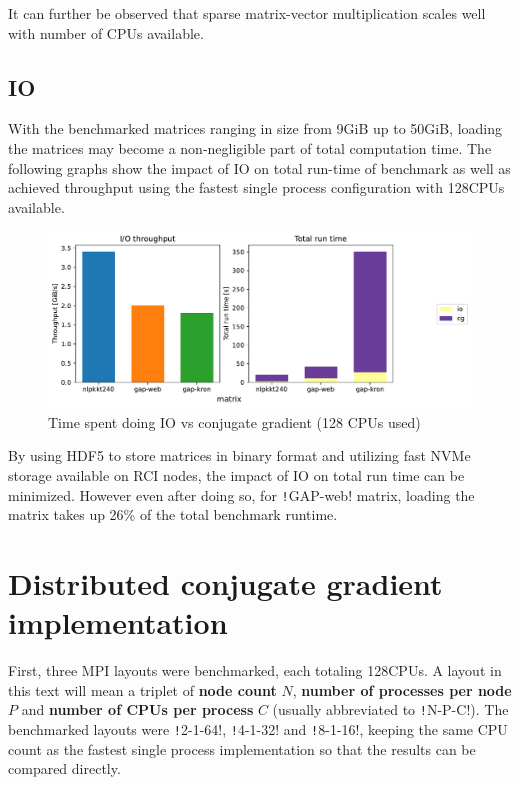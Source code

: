 \documentclass[thesis=M,english]{FITthesis}[2019/12/23]
\newcommand{\csre}[1]{\texttt!#1!}
\begin{document}
It can further be observed that sparse matrix-vector multiplication scales well with
number of CPUs available.

\subsection{IO}

With the benchmarked matrices ranging in size from 9GiB up to 50GiB, loading the matrices
may become a non-negligible part of total computation time. The following graphs show the impact of
IO on total run-time of benchmark as well as achieved throughput using the fastest single process
configuration with 128CPUs available.

\begin{figure}[htp]
    \centering
    \includegraphics[scale=0.6]{static/io_sp.pdf}
    \caption{Time spent doing IO vs conjugate gradient (128 CPUs used)}
\end{figure}

By using HDF5 to store matrices in binary format and utilizing fast NVMe storage available
on RCI nodes, the impact of IO on total run time can be minimized. However even after doing so,
for \csre{GAP-web} matrix, loading the matrix takes up 26\% of the total benchmark runtime.


\section{Distributed conjugate gradient implementation}

First, three MPI layouts were benchmarked, each totaling 128CPUs. A layout
in this text will mean a triplet of \textbf{node count} $N$,
\textbf{number of processes per node} $P$
and \textbf{number of CPUs per process} $C$ (usually abbreviated to \csre{N-P-C}).
The benchmarked layouts were \csre{2-1-64}, \csre{4-1-32} and \csre{8-1-16}, keeping
the same CPU count as the fastest single process implementation so that the results
can be compared directly.
\end{document}
